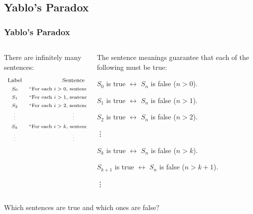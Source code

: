 \subsection{Yablo's Paradox}

\begin{frame}
 \frametitle{Yablo's Paradox}

  \begin{columns}
    \begin{column}{.6\textwidth}
    There are infinitely many sentences:
\[
\begin{array}{cc}
\text{\footnotesize Label} & \text{\footnotesize Sentence} \\
 \text{\scriptsize $S_0$} & \text{\scriptsize ``For each \(i>0\), sentence \(S_i\) is false''} \\
\text{\scriptsize $S_1$} & \text{\scriptsize ``For each \(i>1\), sentence \(S_i\) is false''} \\
\text{\scriptsize $S_2$} & \text{\scriptsize ``For each \(i>2\), sentence \(S_i\) is false''} \\
\text{\tiny\vdots} & \text{\tiny\vdots}\\
\text{\scriptsize $S_k$} & \text{\scriptsize ``For each \(i>k\), sentence \(S_i\) is false''} \\
\text{\tiny\vdots} & \text{\tiny\vdots}\\[2ex] 
\end{array}
\]
    \end{column}
    \begin{column}{.4\textwidth}
    \small{The sentence meanings guarantee that each of the following must be true:\\[1ex]}
    \begin{itemize}
    {\scriptsize
\item[(0)] \(S_0\) is true $\leftrightarrow$ \(S_n\) is false (\(n>0\)).\\[1.5ex]

\item[(1)] \(S_1\) is true $\leftrightarrow$ \(S_n\)  is false (\(n>1\)).\\[1.5ex]

\item[(2)] \(S_2\) is true $\leftrightarrow$ \(S_n\) is false (\(n>2\)).

\hspace{5mm }\vdots

\item[(k)] \(S_k\) is true $\leftrightarrow$ \(S_n\)  is false (\(n>k\)).
\item[(k+1)] \(S_{k+1}\) is true $\leftrightarrow$ \(S_n\)  is false (\(n>k+1\)).

\hspace{5mm }\vdots }
\end{itemize} 
    \end{column}
  \end{columns}
Which sentences are true and which ones are false?
\end{frame}

